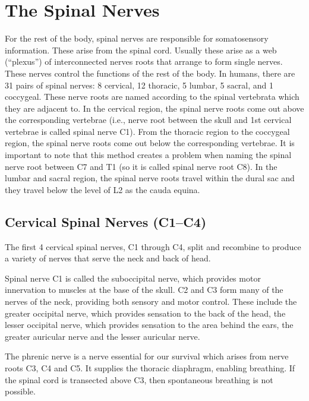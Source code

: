 \hypertarget{the-spinal-nerves}{%
\section{The Spinal Nerves}\label{the-spinal-nerves}}

For the rest of the body, spinal nerves are responsible for somatosensory information. These arise from the spinal cord. Usually these arise as a web (``plexus'') of interconnected nerves roots that arrange to form single nerves. These nerves control the functions of the rest of the body. In humans, there are 31 pairs of spinal nerves: 8 cervical, 12 thoracic, 5 lumbar, 5 sacral, and 1 coccygeal. These nerve roots are named according to the spinal vertebrata which they are adjacent to. In the cervical region, the spinal nerve roots come out above the corresponding vertebrae (i.e., nerve root between the skull and 1st cervical vertebrae is called spinal nerve C1). From the thoracic region to the coccygeal region, the spinal nerve roots come out below the corresponding vertebrae. It is important to note that this method creates a problem when naming the spinal nerve root between C7 and T1 (so it is called spinal nerve root C8). In the lumbar and sacral region, the spinal nerve roots travel within the dural sac and they travel below the level of L2 as the cauda equina.

\hypertarget{cervical-spinal-nerves-c1c4}{%
\subsection{Cervical Spinal Nerves (C1--C4)}\label{cervical-spinal-nerves-c1c4}}

The first 4 cervical spinal nerves, C1 through C4, split and recombine to produce a variety of nerves that serve the neck and back of head.

Spinal nerve C1 is called the suboccipital nerve, which provides motor innervation to muscles at the base of the skull. C2 and C3 form many of the nerves of the neck, providing both sensory and motor control. These include the greater occipital nerve, which provides sensation to the back of the head, the lesser occipital nerve, which provides sensation to the area behind the ears, the greater auricular nerve and the lesser auricular nerve.

The phrenic nerve is a nerve essential for our survival which arises from nerve roots C3, C4 and C5. It supplies the thoracic diaphragm, enabling breathing. If the spinal cord is transected above C3, then spontaneous breathing is not possible.

